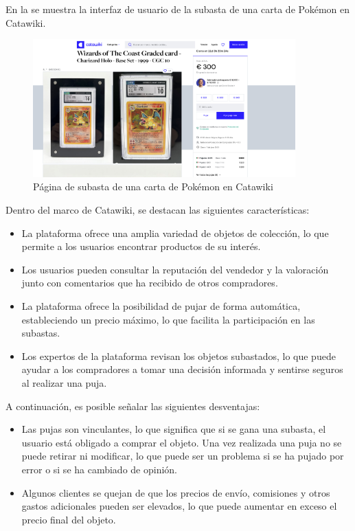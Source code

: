 En la  se muestra la interfaz de usuario de la subasta de una carta de Pokémon en Catawiki.
\begin{figure}[H]
    \centering
    \includegraphics[width=0.9\textwidth]{figures/4-Estudio-viabilidad/4_Catawiki-puja.png}
    \caption{Página de subasta de una carta de Pokémon en Catawiki}
    \label{fig:catawiki2}
    \hypertarget{fig:catawiki2}{}
\end{figure}

Dentro del marco de Catawiki, se destacan las siguientes características:
\begin{itemize}
    \item La plataforma ofrece una amplia variedad de objetos de colección, lo que permite a los usuarios encontrar productos de su interés.
    \item Los usuarios pueden consultar la reputación del vendedor y la valoración junto con comentarios que ha recibido de otros compradores.
    \item La plataforma ofrece la posibilidad de pujar de forma automática, estableciendo un precio máximo, lo que facilita la participación en las subastas.
    \item Los expertos de la plataforma revisan los objetos subastados, lo que puede ayudar a los compradores a tomar una decisión informada y sentirse seguros al realizar una puja.
\end{itemize}

A continuación, es posible señalar las siguientes desventajas:
\begin{itemize}
    \item Las pujas son vinculantes, lo que significa que si se gana una subasta, el usuario está obligado a comprar el objeto.
    Una vez realizada una puja no se puede retirar ni modificar, lo que puede ser un problema si se ha pujado por error o si se ha cambiado de opinión.
    \item Algunos clientes se quejan de que los precios de envío, comisiones y otros gastos adicionales pueden ser elevados, lo que puede aumentar en exceso el precio final del objeto.
\end{itemize}

